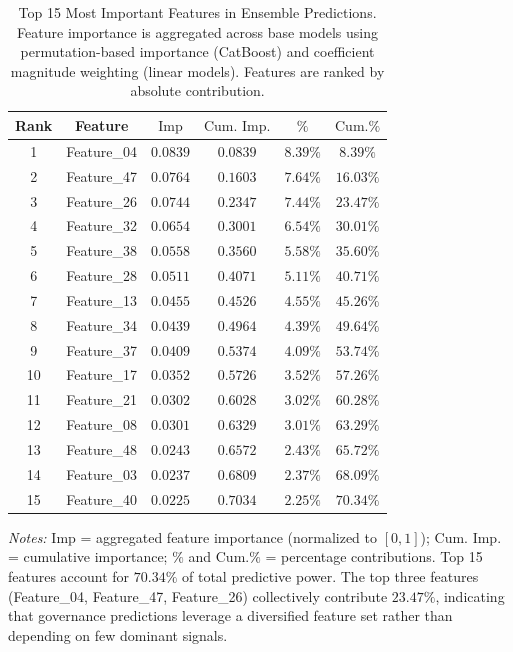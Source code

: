\documentclass[12pt,a4paper]{article}
\begin{document}
\begin{table}[H]
\centering
\caption{%
    Top 15 Most Important Features in Ensemble Predictions.
    Feature importance is aggregated across base models using permutation-based importance (CatBoost) 
    and coefficient magnitude weighting (linear models). Features are ranked by absolute contribution.
}
\label{tab:feature_importance}
\small
\begin{tabular}{cccccc}
\toprule
\textbf{Rank} & \textbf{Feature} & $\text{Imp}$ & $\text{Cum. Imp.}$ & $\%$ & $\text{Cum.}\%$ \\
\midrule
1  & Feature\_04  & $0.0839$ & $0.0839$ & $8.39\%$ & $8.39\%$ \\
2  & Feature\_47  & $0.0764$ & $0.1603$ & $7.64\%$ & $16.03\%$ \\
3  & Feature\_26  & $0.0744$ & $0.2347$ & $7.44\%$ & $23.47\%$ \\
4  & Feature\_32  & $0.0654$ & $0.3001$ & $6.54\%$ & $30.01\%$ \\
5  & Feature\_38  & $0.0558$ & $0.3560$ & $5.58\%$ & $35.60\%$ \\
6  & Feature\_28  & $0.0511$ & $0.4071$ & $5.11\%$ & $40.71\%$ \\
7  & Feature\_13  & $0.0455$ & $0.4526$ & $4.55\%$ & $45.26\%$ \\
8  & Feature\_34  & $0.0439$ & $0.4964$ & $4.39\%$ & $49.64\%$ \\
9  & Feature\_37  & $0.0409$ & $0.5374$ & $4.09\%$ & $53.74\%$ \\
10 & Feature\_17  & $0.0352$ & $0.5726$ & $3.52\%$ & $57.26\%$ \\
11 & Feature\_21  & $0.0302$ & $0.6028$ & $3.02\%$ & $60.28\%$ \\
12 & Feature\_08  & $0.0301$ & $0.6329$ & $3.01\%$ & $63.29\%$ \\
13 & Feature\_48  & $0.0243$ & $0.6572$ & $2.43\%$ & $65.72\%$ \\
14 & Feature\_03  & $0.0237$ & $0.6809$ & $2.37\%$ & $68.09\%$ \\
15 & Feature\_40  & $0.0225$ & $0.7034$ & $2.25\%$ & $70.34\%$ \\
\bottomrule
\end{tabular}
\begin{flushleft}
\footnotesize
\textit{Notes:} 
$\text{Imp}$ = aggregated feature importance (normalized to $[0, 1]$);
$\text{Cum. Imp.}$ = cumulative importance;
$\%$ and $\text{Cum.}\%$ = percentage contributions.
Top 15 features account for $70.34\%$ of total predictive power.
The top three features (Feature\_04, Feature\_47, Feature\_26) collectively contribute $23.47\%$,
indicating that governance predictions leverage a diversified feature set rather than depending on few dominant signals.
\end{flushleft}
\end{table}
\end{document}
